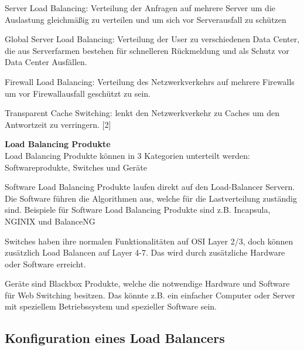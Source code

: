 Server Load Balancing: Verteilung der Anfragen auf mehrere Server um die Auslastung gleichmäßig zu verteilen und um sich vor Serverausfall zu schützen

Global Server Load Balancing: Verteilung der User zu verschiedenen Data Center, die aus Serverfarmen bestehen für schnelleren Rückmeldung und als Schutz vor Data Center Ausfällen.

Firewall Load Balancing: Verteilung des Netzwerkverkehrs auf mehrere Firewalls um vor Firewallausfall geschützt zu sein.

Transparent Cache Switching: lenkt den Netzwerkverkehr zu Caches um den Antwortzeit zu verringern. [2]

\textbf{Load Balancing Produkte} \\

Load Balancing Produkte können in 3 Kategorien unterteilt werden: Softwareprodukte,  Switches und  Geräte

Software Load Balancing Produkte laufen direkt auf den Load-Balancer Servern. Die Software führen die Algorithmen aus, welche für die Lastverteilung zuständig sind. Beispiele für Software Load Balancing Produkte sind z.B. Incapsula, NGINIX und BalanceNG 

Switches haben ihre normalen Funktionalitäten auf OSI Layer 2/3, doch können zusätzlich Load Balancen auf Layer 4-7. Das wird durch zusätzliche Hardware oder Software erreicht.  

Geräte sind Blackbox Produkte, welche die notwendige Hardware und Software für Web Switching besitzen. Das könnte z.B. ein einfacher Computer oder Server mit speziellem Betriebssystem und spezieller Software sein. \cite{LoadBalancing2}

\subsection{Konfiguration eines Load Balancers}
\label{sec:Konfiguration eines Load Balancers}

